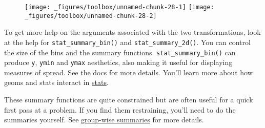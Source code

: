 \begin{Shaded}
\begin{Highlighting}[]
\OperatorTok{+}\StringTok{ }
\StringTok{  }\NormalTok{(} \NormalTok{, } \NormalTok{) }\OperatorTok{+}\StringTok{ }
\StringTok{  }\NormalTok{(}\NormalTok{, }\NormalTok{) }\OperatorTok{+}\StringTok{ }
\StringTok{  }\NormalTok{(}\NormalTok{, }\NormalTok{)}

\OperatorTok{+}\StringTok{ }
\StringTok{  }\NormalTok{(} \NormalTok{, } \NormalTok{, }
     \NormalTok{) }\OperatorTok{+}\StringTok{ }
\StringTok{  }\NormalTok{(}\NormalTok{, }\NormalTok{) }\OperatorTok{+}\StringTok{ }
\StringTok{  }\NormalTok{(}\NormalTok{, }\NormalTok{)}
\end{Highlighting}
\end{Shaded}

\begin{figure}[H]
  \texttt{[image: \_figures/toolbox/unnamed-chunk-28-1]}%
  \texttt{[image: \_figures/toolbox/unnamed-chunk-28-2]}
\end{figure}

To get more help on the arguments associated with the two
transformations, look at the help for \texttt{stat\_summary\_bin()} and
\texttt{stat\_summary\_2d()}. You can control the size of the bins and
the summary functions. \texttt{stat\_summary\_bin()} can produce
\texttt{y}, \texttt{ymin} and \texttt{ymax} aesthetics, also making it
useful for displaying measures of spread. See the docs for more details.
You'll learn more about how geoms and stats interact in
\protect\hyperlink{sec:stat}{stats}.

These summary functions are quite constrained but are often useful for a
quick first pass at a problem. If you find them restraining, you'll need
to do the summaries yourself. See
\protect\hyperlink{sec:summarise}{group-wise summaries} for more
details.

